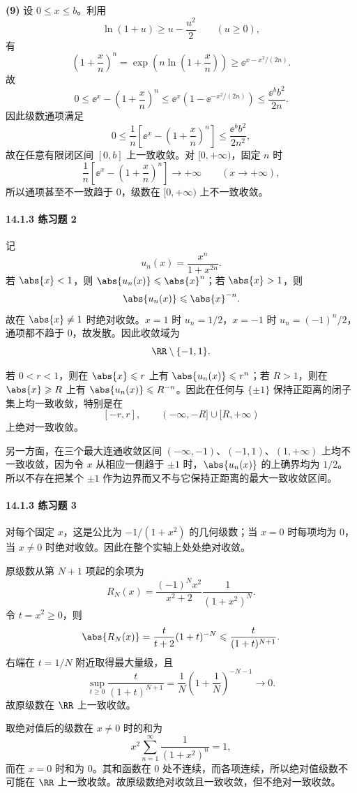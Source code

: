\begin{xsolution}
\textbf{(9)} 设 $0\leqslant x\leqslant b$。利用
\[
  \ln(1+u)\geqslant u-\frac{u^2}{2}\qquad(u\geqslant0),
\]
有
\[
  \left(1+\frac xn\right)^n
  =\exp\left(n\ln\left(1+\frac xn\right)\right)
  \geqslant \ee^{x-x^2/(2n)}.
\]
故
\[
  0\leqslant \ee^x-\left(1+\frac xn\right)^n
  \leqslant \ee^x\left(1-\ee^{-x^2/(2n)}\right)
  \leqslant \frac{\ee^b b^2}{2n}.
\]
因此级数通项满足
\[
  0\leqslant \frac1n\left[\ee^x-\left(1+\frac xn\right)^n\right]
  \leqslant\frac{\ee^b b^2}{2n^2},
\]
故在任意有限闭区间 $[0,b]$ 上一致收敛。对 $[0,+\infty)$，固定 $n$ 时
\[
  \frac1n\left[\ee^x-\left(1+\frac xn\right)^n\right]\to+\infty
  \qquad(x\to+\infty),
\]
所以通项甚至不一致趋于 $0$，级数在 $[0,+\infty)$ 上不一致收敛。
\end{xsolution}

\paragraph{14.1.3 练习题 2}
\begin{xsolution}
记
\[
  u_n(x)=\frac{x^n}{1+x^{2n}}.
\]
若 $\abs{x}<1$，则 $\abs{u_n(x)}\leqslant\abs{x}^n$；若 $\abs{x}>1$，则
\[
  \abs{u_n(x)}\leqslant\abs{x}^{-n}.
\]
故在 $\abs{x}\ne1$ 时绝对收敛。$x=1$ 时 $u_n=1/2$，$x=-1$ 时 $u_n=(-1)^n/2$，通项都不趋于 $0$，故发散。因此收敛域为
\[
  \RR\setminus\{-1,1\}.
\]

若 $0<r<1$，则在 $\abs{x}\leqslant r$ 上有 $\abs{u_n(x)}\leqslant r^n$；若 $R>1$，则在 $\abs{x}\geqslant R$ 上有 $\abs{u_n(x)}\leqslant R^{-n}$。因此在任何与 $\{\pm1\}$ 保持正距离的闭子集上均一致收敛，特别是在
\[
  [-r,r],\qquad (-\infty,-R]\cup[R,+\infty)
\]
上绝对一致收敛。

另一方面，在三个最大连通收敛区间 $(-\infty,-1)$、$(-1,1)$、$(1,+\infty)$ 上均不一致收敛，因为令 $x$ 从相应一侧趋于 $\pm1$ 时，$\abs{u_n(x)}$ 的上确界均为 $1/2$。所以不存在把某个 $\pm1$ 作为边界而又不与它保持正距离的最大一致收敛区间。
\end{xsolution}

\paragraph{14.1.3 练习题 3}
\begin{xsolution}
对每个固定 $x$，这是公比为 $-1/(1+x^2)$ 的几何级数；当 $x=0$ 时每项均为 $0$，当 $x\ne0$ 时绝对收敛。因此在整个实轴上处处绝对收敛。

原级数从第 $N+1$ 项起的余项为
\[
  R_N(x)=\frac{(-1)^N x^2}{x^2+2}\frac1{(1+x^2)^N}.
\]
令 $t=x^2\geqslant0$，则
\[
  \abs{R_N(x)}
  =\frac{t}{t+2}(1+t)^{-N}
  \leqslant\frac{t}{(1+t)^{N+1}}.
\]
右端在 $t=1/N$ 附近取得最大量级，且
\[
  \sup_{t\geqslant0}\frac{t}{(1+t)^{N+1}}
  =\frac1N\left(1+\frac1N\right)^{-N-1}\to0.
\]
故原级数在 $\RR$ 上一致收敛。

取绝对值后的级数在 $x\ne0$ 时的和为
\[
  x^2\sum_{n=1}^{\infty}\frac1{(1+x^2)^n}=1,
\]
而在 $x=0$ 时和为 $0$。其和函数在 $0$ 处不连续，而各项连续，所以绝对值级数不可能在 $\RR$ 上一致收敛。故原级数绝对收敛且一致收敛，但不绝对一致收敛。
\end{xsolution}

